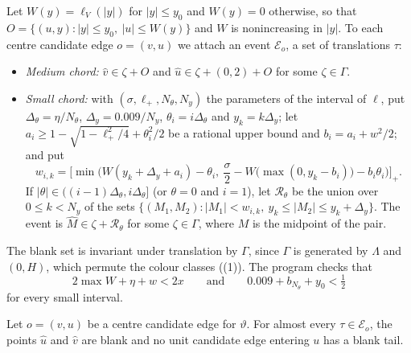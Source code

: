 \documentclass[11pt,colorlinks]{charlie}
\begin{document}
Let $W(y)=\ell_V(|y|)$ for $|y|\le y_0$ and $W(y)=0$ otherwise, so that $O=\{(u,y):|y|\le y_0,\ |u|\le W(y)\}$ and $W$ is nonincreasing in $|y|$. To each centre candidate edge $o=(v,u)$ we attach an event $\mathcal E_o$, a set of translations $\tau$:
\begin{itemize}
\item \emph{Medium chord:} $\hat v\in\zeta+O$ and $\hat u\in\zeta+(0,2)+O$ for some $\zeta\in\Gamma$.
\item \emph{Small chord:} with $(\sigma,\ell_+,N_\theta,N_y)$ the parameters of the interval of $\ell$, put $\Delta_\theta=\eta/N_\theta$, $\Delta_y=0.009/N_y$, $\theta_i=i\Delta_\theta$ and $y_k=k\Delta_y$; let $a_i\ge1-\sqrt{1-\ell_+^2/4}+\theta_i^2/2$ be a rational upper bound and $b_i=a_i+w^2/2$; and put
\[
 w_{i,k}=\Big[\min\Big(W(y_k+\Delta_y+a_i)-\theta_i,\ \frac\sigma2-W\big(\max(0,y_k-b_i)\big)-b_i\theta_i\Big)\Big]_+ .
\]
If $|\theta|\in((i-1)\Delta_\theta,i\Delta_\theta]$ (or $\theta=0$ and $i=1$), let $\mathcal R_\theta$ be the union over $0\le k<N_y$ of the sets $\{(M_1,M_2):|M_1|<w_{i,k},\ y_k\le|M_2|\le y_k+\Delta_y\}$. The event is $\hat M\in\zeta+\mathcal R_\theta$ for some $\zeta\in\Gamma$, where $M$ is the midpoint of the pair.
\end{itemize}
The blank set is invariant under translation by $\Gamma$, since $\Gamma$ is generated by $\Lambda$ and $(0,H)$, which permute the colour classes ((1)). The program checks that
\begin{equation}\label{eq:onlyhole}
 2\max W+\eta+w<2x\qquad\text{and}\qquad 0.009+b_{N_\theta}+y_0<\tfrac12
\end{equation}
for every small interval.

\begin{lemma}\label{lem:centre-event}
Let $o=(v,u)$ be a centre candidate edge for $\vartheta$. For almost every $\tau\in\mathcal E_o$, the points $\hat u$ and $\hat v$ are blank and no unit candidate edge entering $u$ has a blank tail.
\end{lemma}
\end{document}

